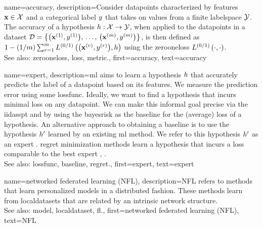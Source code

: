 {name={accuracy},
	description={Consider \glspl{datapoint} characterized by \glspl{feature} ${\bf x} \in \mathcal{X}$ and 
		a categorical \gls{label} $y$ that takes on values from a finite \gls{labelspace} $\mathcal{Y}$. The 
		accuracy of a \gls{hypothesis} $h: \mathcal{X} \rightarrow \mathcal{Y}$, when applied to the \glspl{datapoint} in a \gls{dataset} 
		$\mathcal{D} = \big\{ \big({\bf x}^{(1)}, y^{(1)} \big), \,\ldots, \,\big({\bf x}^{(m)},y^{(m)}\big) \big\}$, 
		is then defined as $1 - (1/m)\sum_{r=1}^{m} L^{(0/1)}\left(\big({\bf x}^{(r)},y^{(r)}\big),h \right)$ 
		using the \gls{zerooneloss} $L^{(0/1)}\left(\cdot,\cdot \right)$.
					\\ 
		See also: \gls{zerooneloss}, \gls{loss}, \gls{metric}.},
	first={accuracy},
	text={accuracy} 
}


{name={expert},
	description={\gls{ml} aims to learn a \gls{hypothesis} $h$ that accurately predicts the \gls{label} 
		of a \gls{datapoint} based on its \glspl{feature}. We measure the \gls{prediction} error using 
		some \gls{lossfunc}. Ideally, we want to find a \gls{hypothesis} that incurs minimal \gls{loss} 
		on any \gls{datapoint}. We can make this informal goal precise via the \gls{iidasspt} 
		and by using the \gls{bayesrisk} as the \gls{baseline} for the (average) \gls{loss} of a \gls{hypothesis}. 
		An alternative approach to obtaining a \gls{baseline} is to use the \gls{hypothesis} $h'$ learned 
		by an existing \gls{ml} method. We refer to this \gls{hypothesis} $h'$ as an expert \cite{PredictionLearningGames}. 
		\Gls{regret} minimization methods learn a \gls{hypothesis}
		that incurs a \gls{loss} comparable to the best expert \cite{PredictionLearningGames}, \cite{HazanOCO}.
					\\ 
		See also: \gls{lossfunc}, \gls{baseline}, \gls{regret}.},
	first={expert},
	text={expert} 
}

{name={networked federated learning (NFL)},
	description={NFL refers 
		to methods that learn personalized \glspl{model} in a distributed fashion. These methods learn from \glspl{localdataset} 
		that are related by an intrinsic network structure.
					\\ 
		See also: \gls{model}, \gls{localdataset}, \gls{fl}.},
	first={networked federated learning (NFL)},
	text={NFL} 
}


